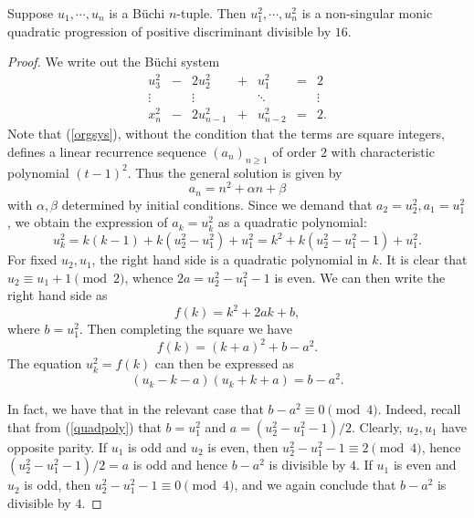 \documentclass[10pt,a4paper]{amsart}
\begin{document}
\begin{proposition} Suppose $u_1, \cdots, u_n$ is a B\"{u}chi $n$-tuple. Then $u_1^2, \cdots, u_n^2$ is a non-singular monic quadratic progression of positive discriminant divisible by $16$. 
\end{proposition} 

\begin{proof}
	
	We write out the B\"{u}chi system
	\begin{equation} \label{orgsys} \begin{matrix} u_3^2 & - & 2 u_2^2 & + & u_1^2 & = & 2 \\ \vdots & & \vdots & & \ddots &  &  \vdots \\ x_{n}^2 & - & 2 u_{n-1}^2 & + & u_{n-2}^2 & = & 2.\end{matrix} 
	\end{equation}
	Note that (\ref{orgsys}), without the condition that the terms are square integers, defines a linear recurrence sequence $(a_n)_{n \geq 1}$ of order $2$ with characteristic polynomial $(t-1)^2$. Thus the general solution is given by 
	\[a_n = n^2 + \alpha n + \beta\]
	with $\alpha, \beta$ determined by initial conditions. Since we demand that $a_2 = u_2^2, a_1 = u_1^2$, we obtain the expression of $a_k = u_k^2$ as a quadratic polynomial: 
	\begin{equation} \label{quadpoly} u_k^2 = k(k-1) + k(u_2^2 - u_1^2) + u_1^2 = k^2 + k(u_2^2 - u_1^2 - 1) + u_1^2.
	\end{equation}
	For fixed $u_2, u_1$, the right hand side is a quadratic polynomial in $k$. It is clear that $u_2 \equiv u_1 + 1 \pmod{2}$, whence $2a = u_2^2 - u_1^2 - 1$ is even. We can then write the right hand side as 
	\[f(k) = k^2 + 2ak + b,\]
	where $b = u_1^2$. Then completing the square we have 
	\[f(k) = (k+a)^2 + b - a^2.\]
	The equation $u_k^2 = f(k)$ can then be expressed as 
	\[(u_k - k - a)(u_k + k + a) = b - a^2.\]
	
	
	In fact, we have that in the relevant case that $b - a^2 \equiv 0 \pmod{4}$. Indeed, recall that from (\ref{quadpoly}) that $b = u_1^2$ and $a = (u_2^2 - u_1^2 - 1)/2$. Clearly, $u_2, u_1$ have opposite parity. If $u_1$ is odd and $u_2$ is even, then $u_2^2 - u_1^2 - 1 \equiv 2 \pmod{4}$, hence $(u_2^2 - u_1^2 - 1)/2 = a$ is odd and hence $b - a^2$ is divisible by $4$. If $u_1$ is even and $u_2$ is odd, then $u_2^2 - u_1^2 - 1 \equiv 0 \pmod{4}$, and we again conclude that $b - a^2$ is divisible by $4$. \end{proof}
\end{document}
